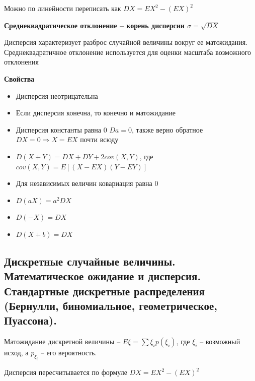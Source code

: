 \documentclass{article}
\begin{document}
Можно по линейности переписать как $DX = EX^2 - (EX)^2$

{\bf Среднеквадратическое отклонение -- корень дисперсии $\sigma = \sqrt{DX}$}

Дисперсия характеризует разброс случайной величины вокруг ее матожидания. Среднеквадратичное отклонение используется для оценки масштаба возможного отклонения

{\bf Свойства}

\begin{itemize}
	\item Дисперсия неотрицательна
	\item Если дисперсия конечна, то конечно и матожидание
	\item Дисперсия константы равна 0 $Da = 0$, также верно обратное $DX = 0 \Rightarrow X = EX$ почти всюду
	\item $D(X + Y) = DX + DY + 2cov(X, Y)$, где $cov(X, Y) = E[(X - EX)(Y - EY)]$
	\item Для независимых величин ковариация равна 0
	\item $D(aX) = a^2DX$
	\item $D(-X) = DX$
	\item $D(X+b) = DX$
\end{itemize}


\subsection{ Дискретные случайные величины. Математическое ожидание и дисперсия. Стандартные дискретные распределения (Бернулли, биномиальное, геометрическое, Пуассона).}




Матожидание дискретной величины -- $E\xi = \sum \xi_i p(\xi_i)$, где $\xi_i$ -- возможный исход, а $p_{\xi_i}$ -- его вероятность.

Дисперсия пересчитывается по формуле $DX = EX^2 - (EX)^2$
\end{document}
